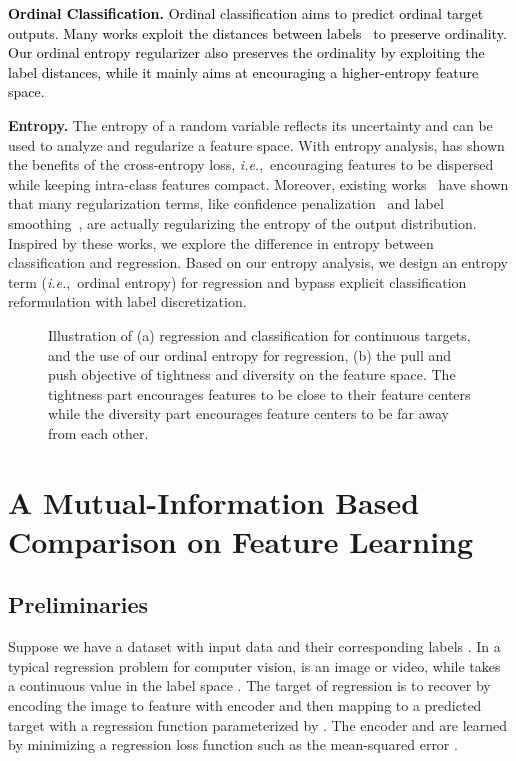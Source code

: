 \documentclass{article} \usepackage{iclr2023_conference,times}
\makeatletter
\newcommand*{\ie}{i.e.\@\xspace}
\def\ie{\mbox{\textit{i.e.}, }}
\def\shihao{\textcolor{black}}
\makeatother
\begin{document}
\shihao{\textbf{Ordinal Classification.} 
Ordinal classification aims to predict ordinal target outputs.
Many works exploit the distances between labels~\citep{castagnos-etal-2022-simple,10.1007/978-3-031-12053-4_12, gong2022ranksim} to preserve ordinality. Our ordinal entropy regularizer also preserves the ordinality by exploiting the label distances, while it mainly aims at encouraging a higher-entropy feature space.
}

\textbf{Entropy.}
The entropy of a random variable reflects its uncertainty and can be used to analyze and regularize a feature space. 
With entropy analysis, \cite{boudiaf2020unifying} has shown the benefits of the cross-entropy loss, \ie encouraging features to be dispersed while keeping intra-class features compact. Moreover, existing works~\citep{pereyra2017regularizing,dubey2017regularizing} have shown that 
many regularization terms, like confidence penalization~\citep{pereyra2017regularizing} and label smoothing~\citep{muller2019does}, are actually regularizing the entropy of the output distribution. Inspired by these works, we explore the difference in entropy between classification and regression. Based on our entropy analysis, we design an entropy term (\ie ordinal entropy) for regression and bypass explicit classification reformulation with label discretization.

\begin{figure}[!t]
\centering
{}
\caption{Illustration of (a) regression and classification for continuous targets, and the use of our ordinal entropy for regression, (b) the pull and push objective of tightness and diversity on the feature space. The tightness part encourages features to be close to their feature centers while the diversity part encourages feature centers
to be far away from each other.}
\label{fig_weightentropy}
\end{figure}

\section{A Mutual-Information Based Comparison 
on Feature Learning}
\label{sec:theory}
\subsection{Preliminaries}
Suppose we have a dataset  with  input data  and their corresponding labels . In a typical regression problem for computer vision,  
is an image or video,  
while  takes a continuous value in the label space .
The target of regression is to recover  by encoding the image to feature  with encoder  and then mapping  to a predicted target  with a regression function  parameterized by . 
The encoder  and  are learned by minimizing a regression loss function such as the mean-squared error . 
\end{document}
